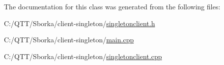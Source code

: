 The documentation for this class was generated from the following files\+:\begin{DoxyCompactItemize}
\item 
C\+:/\+Q\+T\+T/\+Sborka/client-\/singleton/\mbox{\hyperlink{singletonclient_8h}{singletonclient.\+h}}\item 
C\+:/\+Q\+T\+T/\+Sborka/client-\/singleton/\mbox{\hyperlink{main_8cpp}{main.\+cpp}}\item 
C\+:/\+Q\+T\+T/\+Sborka/client-\/singleton/\mbox{\hyperlink{singletonclient_8cpp}{singletonclient.\+cpp}}\end{DoxyCompactItemize}
